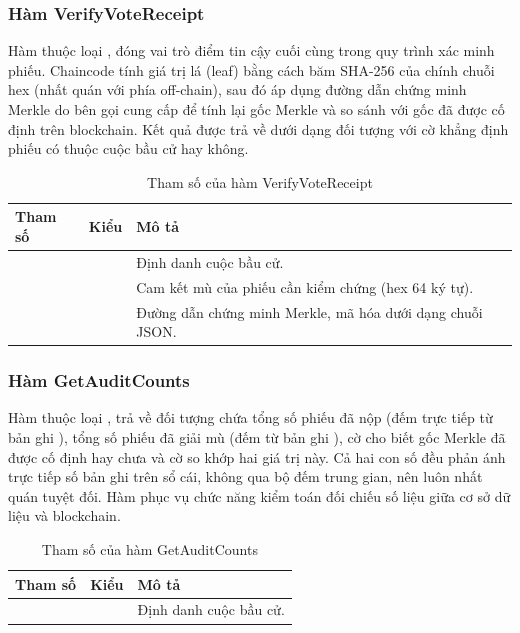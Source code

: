 \subsubsection{Hàm VerifyVoteReceipt}

Hàm  thuộc loại , đóng vai trò điểm tin cậy cuối cùng trong quy trình xác minh phiếu. Chaincode tính giá trị lá (leaf) bằng cách băm SHA-256 của chính chuỗi hex  (nhất quán với phía off-chain), sau đó áp dụng đường dẫn chứng minh Merkle do bên gọi cung cấp để tính lại gốc Merkle và so sánh với gốc đã được cố định trên blockchain. Kết quả được trả về dưới dạng đối tượng  với cờ  khẳng định phiếu có thuộc cuộc bầu cử hay không.

\begin{table}[H]
    \centering
    \small
    \setlength{\tabcolsep}{3pt}
    \caption{Tham số của hàm VerifyVoteReceipt}
    \label{tab:cc-verifyvotereceipt}
    \begin{tabularx}{\textwidth}{|L{0.25}|L{0.25}|L{0.50}|}
    \hline
    \textbf{Tham số} & \textbf{Kiểu} & \textbf{Mô tả} \\
    \hline
            &  & Định danh cuộc bầu cử. \\ \hline
     &  & Cam kết mù của phiếu cần kiểm chứng (hex 64 ký tự). \\ \hline
             &  & Đường dẫn chứng minh Merkle, mã hóa dưới dạng chuỗi JSON. \\ \hline
    \end{tabularx}
\end{table}

\subsubsection{Hàm GetAuditCounts}

Hàm  thuộc loại , trả về đối tượng  chứa tổng số phiếu đã nộp (đếm trực tiếp từ bản ghi ), tổng số phiếu đã giải mù (đếm từ bản ghi ), cờ cho biết gốc Merkle đã được cố định hay chưa và cờ so khớp hai giá trị này. Cả hai con số đều phản ánh trực tiếp số bản ghi trên sổ cái, không qua bộ đếm trung gian, nên luôn nhất quán tuyệt đối. Hàm phục vụ chức năng kiểm toán đối chiếu số liệu giữa cơ sở dữ liệu và blockchain.

\begin{table}[H]
    \centering
    \small
    \setlength{\tabcolsep}{3pt}
    \caption{Tham số của hàm GetAuditCounts}
    \label{tab:cc-getauditcounts}
    \begin{tabularx}{\textwidth}{|L{0.25}|L{0.25}|L{0.50}|}
    \hline
    \textbf{Tham số} & \textbf{Kiểu} & \textbf{Mô tả} \\
    \hline
     &  & Định danh cuộc bầu cử. \\ \hline
    \end{tabularx}
\end{table}

